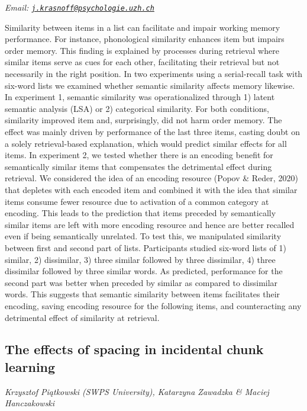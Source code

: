 \documentclass[12pt,]{book}
\begin{document}
\emph{Email: \href{mailto:j.krasnoff@psychologie.uzh.ch}{\nolinkurl{j.krasnoff@psychologie.uzh.ch}}}

Similarity between items in a list can facilitate and impair working memory performance. For instance, phonological similarity enhances item but impairs order memory. This finding is explained by processes during retrieval where similar items serve as cues for each other, facilitating their retrieval but not necessarily in the right position. In two experiments using a serial-recall task with six-word lists we examined whether semantic similarity affects memory likewise. In experiment 1, semantic similarity was operationalized through 1) latent semantic analysis (LSA) or 2) categorical similarity. For both conditions, similarity improved item and, surprisingly, did not harm order memory. The effect was mainly driven by performance of the last three items, casting doubt on a solely retrieval-based explanation, which would predict similar effects for all items. In experiment 2, we tested whether there is an encoding benefit for semantically similar items that compensates the detrimental effect during retrieval. We considered the idea of an encoding resource (Popov \& Reder, 2020) that depletes with each encoded item and combined it with the idea that similar items consume fewer resource due to activation of a common category at encoding. This leads to the prediction that items preceded by semantically similar items are left with more encoding resource and hence are better recalled even if being semantically unrelated. To test this, we manipulated similarity between first and second part of lists. Participants studied six-word lists of 1) similar, 2) dissimilar, 3) three similar followed by three dissimilar, 4) three dissimilar followed by three similar words. As predicted, performance for the second part was better when preceded by similar as compared to dissimilar words. This suggests that semantic similarity between items facilitates their encoding, saving encoding resource for the following items, and counteracting any detrimental effect of similarity at retrieval.

\hypertarget{the-effects-of-spacing-in-incidental-chunk-learning}{%
\subsection{The effects of spacing in incidental chunk learning}\label{the-effects-of-spacing-in-incidental-chunk-learning}}

\emph{Krzysztof Piątkowski (SWPS University), Katarzyna Zawadzka \& Maciej Hanczakowski}
\end{document}
